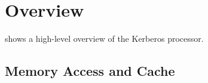 \chapter{Overview}

 shows a high-level overview of
the Kerberos processor.



\section{Memory Access and Cache}

